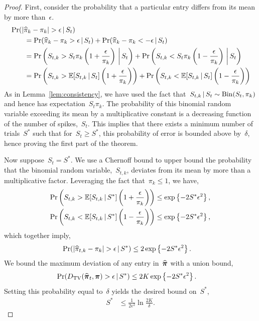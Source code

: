 \begin{proof}
First, consider the probability that a particular entry differs from its mean by more than~$\epsilon$.
\begin{align*}
  &\Pr(|\widehat{\pi}_k - \pi_k |  > \epsilon \,|\, S_t) \\
  &\qquad= \Pr(\widehat{\pi}_k - \pi_k  > \epsilon \,|\, S_t) + 
  \Pr(\widehat{\pi}_k - \pi_k  < -\epsilon \,|\, S_t) \\
  &\qquad= \Pr \left(S_{t, k} > S_t \pi_{ k} \left(1+\frac{\epsilon}{\pi_{ k}} \right) \, \bigg| \, S_t \right) 
  +\Pr \left(S_{t, k} < S_t \pi_{ k} \left(1-\frac{\epsilon}{\pi_{ k}} \right) \, \bigg| \, S_t\right) \\
  &\qquad= \Pr \left(S_{t, k} > \mathbb{E}[S_{t,k} \,|\, S_t] \left(1+\frac{\epsilon}{\pi_{ k}} \right) \right) 
   +\Pr \left(S_{t, k} < \mathbb{E}[S_{t,k} \,|\, S_t] \left(1-\frac{\epsilon}{\pi_{ k}} \right) \right)
\end{align*}
As in Lemma~\ref{lem:consistency}, we have used the fact
that~$S_{t, k} \,|\, S_t \sim \mathrm{Bin}(S_t, \pi_{ k})$
and hence has expectation~$S_t \pi_{ k}$. 
The probability of this binomial random variable exceeding its mean 
by a multiplicative constant is a decreasing function of the 
number of spikes,~$S_t$. This implies that there exists a minimum 
number of trials~$S^*$ such that for~$S_t \geq S^*$, this probability 
of error is bounded above by~$\delta$, hence proving the first part 
of the theorem.

Now suppose~$S_t=S^*$.  We use a Chernoff bound to upper bound the
probability that the binomial random variable,~$S_{t,k}$, deviates
from its mean by more than a multiplicative factor. Leveraging the
fact that~$\pi_{k} \leq 1$, we have,
\begin{align*}
  \Pr \left(S_{t,k} > \mathbb{E}[S_{t,k} \,|\, S^*] \left(1+\frac{\epsilon}{\pi_{k}} \right) \right) 
  &\leq \exp \left \{-2S^* \epsilon^2 \right \}, \\
  \Pr \left(S_{t,k} < \mathbb{E}[S_{t,k} \,|\, S^*] \left(1-\frac{\epsilon}{\pi_{k}} \right) \right) 
  &\leq \exp \left \{-2S^* \epsilon^2 \right \},
\end{align*}
which together imply,
\begin{align*}
  \Pr(|\widehat{\pi}_{t,k} - \pi_{k} |  > \epsilon \,|\, S^*) 
  &\leq 2 \exp \left \{-2S^* \epsilon^2 \right \}.
\end{align*}
We bound the maximum deviation of any entry in~$\widehat{\boldsymbol{\pi}}$ with a union bound,
\begin{align*}
  \Pr({D_{\mathrm{TV}}}(\widehat{\boldsymbol{\pi}}_t, \boldsymbol{\pi}) > \epsilon \,|\, S^*) 
  & \leq 2K \exp \left\{-2S^* \epsilon^2 \right\}.
\end{align*}
Setting this probability equal to~$\delta$ yields the desired bound on~$S^*$,
\begin{align*}
  S^* &\leq \frac{1}{2\epsilon^2} \ln \frac{2K}{\delta}.
\end{align*}

\end{proof}



